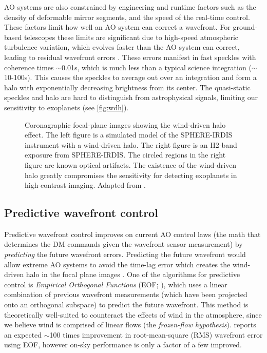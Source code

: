 AO systems are also constrained by engineering and runtime factors such as the density of deformable mirror segments, and the speed of the real-time control. These factors limit how well an AO system can correct a wavefront. For ground-based telescopes these limits are significant due to high-speed atmospheric turbulence variation, which evolves faster than the AO system can correct, leading to residual wavefront errors \citep{Soummer_2007}. These errors manifest in fast speckles with coherence times $\sim$0.01s, which is much less than a typical science integration ($\sim$10-100s). This causes the speckles to average out over an integration and form a halo with exponentially decreasing brightness from its center. The quasi-static speckles and halo are hard to distinguish from astrophysical signals, limiting our sensitivity to exoplanets (see \autoref{fig:wdh}).

\begin{figure}
    \centering
    \caption{Coronagraphic focal-plane images showing the wind-driven halo effect. The left figure is a simulated model of the SPHERE-IRDIS instrument with a wind-driven halo. The right figure is an H2-band exposure from SPHERE-IRDIS. The circled regions in the right figure are known optical artifacts. The existence of the wind-driven halo greatly compromises the sensitivity for detecting exoplanets in high-contrast imaging. Adapted from \cite{2020AA...638A..98C}.}
    \label{fig:wdh}
\end{figure}

\subsection{Predictive wavefront control} \label{sec:pwfc}

Predictive wavefront control improves on current AO control laws (the math that determines the DM commands given the wavefront sensor measurement) by \textit{predicting} the future wavefront errors. Predicting the future wavefront would allow extreme AO systems to avoid the time-lag error which creates the wind-driven halo in the focal plane images \citep{2018ARA&A..56..315G}. One of the algorithms for predictive control is \textit{Empirical Orthogonal Functions} (EOF; \citealp{guyon_adaptive_2017}), which uses a linear combination of previous wavefront measurements (which have been projected onto an orthogonal subspace) to predict the future wavefront. This method is theoretically well-suited to counteract the effects of wind in the atmosphere, since we believe wind is comprised of linear flows (the \textit{frozen-flow hypothesis}). \citet{guyon_adaptive_2017} reports an expected $\sim$100 times improvement in root-mean-square (RMS) wavefront error using EOF, however on-sky performance is only a factor of a few improved.


